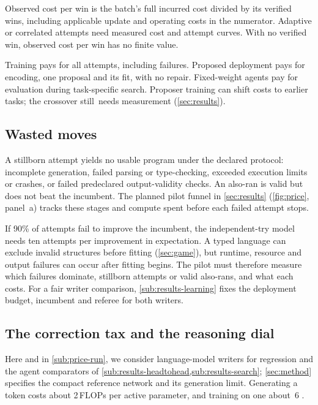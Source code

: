 Observed cost per win is the batch's full incurred cost divided by its
verified wins, including applicable update and operating costs in the
numerator. Adaptive or correlated attempts need measured cost and attempt
curves. With no verified win, observed cost per win has no finite value.

Training pays for all attempts, including failures. Proposed deployment
pays for encoding, one proposal and its fit, with no repair. Fixed-weight
agents pay for evaluation during task-specific search. Proposer training
can shift costs to earlier tasks; the crossover \mbox{still needs}
measurement (\cref{sec:results}).

\subsection{Wasted moves}\label{sub:price-waste}

A stillborn attempt yields no usable program under the declared protocol:
incomplete generation, failed parsing or type-checking, exceeded execution limits or
crashes, or failed predeclared output-validity checks. An also-ran is valid
but does not beat the incumbent. The planned pilot funnel in
\cref{sec:results} (\cref{fig:price}, panel~a) tracks these stages and
compute spent before each failed attempt stops.

If 90\% of attempts fail to improve the incumbent, the independent-try
model needs ten attempts per improvement in expectation. A typed language
can exclude invalid structures before fitting (\cref{sec:game}), but runtime,
resource and output failures can occur after fitting begins. The pilot must therefore measure which failures dominate, stillborn
attempts or valid also-rans, and what each costs. For a fair writer comparison,
\cref{sub:results-learning} fixes the \mbox{deployment} budget, incumbent
and referee for both writers.

\subsection{The correction tax and the reasoning dial}\label{sub:price-tax}

Here and in \cref{sub:price-run}, we consider language-model writers for
regression and the agent comparators of
\cref{sub:results-headtohead,sub:results-search}; \cref{sec:method}
specifies the compact reference network and its generation limit.
Generating a token costs about 2\,FLOPs per active parameter, and
training on one about~6 \citep{kaplan2020scaling}.

